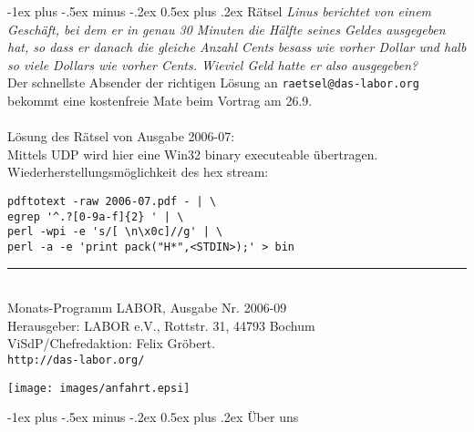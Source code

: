 \documentclass[10pt,landscape,a4paper]{article}
\makeatletter
\renewcommand{\section}{\@startsection{section}{1}{0mm}%
    {-1ex plus -.5ex minus -.2ex}%
    {0.5ex plus .2ex}%
    {\normalfont\large\bfseries}}
\makeatother
\begin{document}
\begin{multicols}{3}
\section{R\"atsel}
\textit{Linus berichtet von einem Gesch\"aft, bei dem er in genau 30 Minuten
die H\"alfte seines Geldes ausgegeben hat, so dass er danach die gleiche
Anzahl Cents besass wie vorher Dollar und halb so viele Dollars wie vorher
Cents. Wieviel Geld hatte er also ausgegeben?}
\\
Der schnellste Absender der richtigen L\"osung
an \verb!raetsel@das-labor.org! bekommt eine kostenfreie Mate beim
Vortrag am 26.9.\\
\\
L\"osung des R\"atsel von Ausgabe 2006-07:\\
Mittels UDP wird hier eine Win32 binary executeable
\"ubertragen. Wiederherstellungsm\"oglichkeit des hex stream:
\begin{verbatim}
pdftotext -raw 2006-07.pdf - | \
egrep '^.?[0-9a-f]{2} ' | \
perl -wpi -e 's/[ \n\x0c]//g' | \
perl -a -e 'print pack("H*",<STDIN>);' > bin
\end{verbatim}

\rule{0.3\linewidth}{0.25pt}\\
{\scriptsize
Monats-Programm LABOR, Ausgabe Nr. 2006-09 \\ %
Herausgeber: LABOR e.V., Rottstr. 31, 44793 Bochum \\
ViSdP/Chefredaktion: Felix Gr\"obert.\\
\verb!http://das-labor.org/!
}
\begin{center}
\centering \texttt{[image: images/anfahrt.epsi]}
\end{center}



\pagebreak




\section{\"Uber uns}


\end{multicols}
\end{document}
